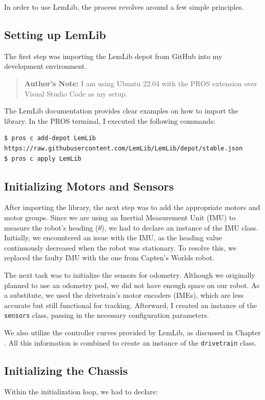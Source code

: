 In order to use LemLib, the process revolves around a few simple principles.  

\subsection*{Setting up LemLib}  
The first step was importing the LemLib depot from GitHub into my development environment.  
\begin{quote}
\textbf{Author's Note:} I am using Ubuntu 22.04 with the PROS extension over Visual Studio Code as my setup.  
\end{quote}

The LemLib documentation provides clear examples on how to import the library. In the PROS terminal, I executed the following commands:  

\begin{verbatim}
$ pros c add-depot LemLib https://raw.githubusercontent.com/LemLib/LemLib/depot/stable.json
$ pros c apply LemLib
\end{verbatim}

\subsection*{Initializing Motors and Sensors}  
After importing the library, the next step was to add the appropriate motors and motor groups. Since we are using an Inertial Measurement Unit (IMU) to measure the robot’s heading ($\theta$), we had to declare an instance of the IMU class. Initially, we encountered an issue with the IMU, as the heading value continuously decreased when the robot was stationary. To resolve this, we replaced the faulty IMU with the one from Capten’s Worlds robot.  

The next task was to initialize the sensors for odometry. Although we originally planned to use an odometry pod, we did not have enough space on our robot. As a substitute, we used the drivetrain's motor encoders (IMEs), which are less accurate but still functional for tracking. Afterward, I created an instance of the \verb|sensors| class, passing in the necessary configuration parameters.  

We also utilize the controller curves provided by LemLib, as discussed in Chapter . All this information is combined to create an instance of the \verb|drivetrain| class.  

\subsection*{Initializing the Chassis}  
Within the initialization loop, we had to declare:  

